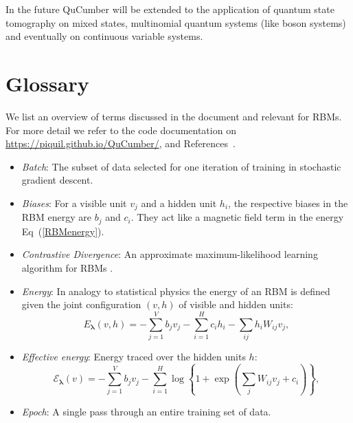 \documentclass[submission, Phys]{SciPost}
\begin{document}
In the future QuCumber will be extended to the application of quantum state tomography on mixed states, multinomial quantum systems (like boson systems) and eventually on continuous variable systems.

\section{Glossary}
\label{Glossary}

We list an overview of terms discussed in the document and relevant for RBMs. For more detail we refer to the code documentation on \url{https://piquil.github.io/QuCumber/}, and References~\cite{hinton2002training, hinton2012practical}.

\begin{itemize}

	\item {\it Batch}: The subset of data selected for one iteration of training in stochastic gradient descent.

	\item {\it Biases}: For a visible unit $v_j$ and a hidden unit $h_i$, the respective biases in the RBM energy are $b_j$ and $c_i$. They act like a magnetic field term in the energy Eq~(\ref{RBMenergy}).

	\item {\it Contrastive Divergence}: An approximate maximum-likelihood learning algorithm for RBMs \cite{hinton2002training}.

	\item {\it Energy}: In analogy to statistical physics the energy of an RBM is defined given the joint configuration $(v,h)$ of visible and hidden units:
	      \begin{equation}
		      E_{\bm{\lambda}}(v,h) = - \sum\limits_{j=1}^V b_j v_j - \sum\limits_{i=1}^H c_i h_i - \sum\limits_{ij} h_i W_{ij} v_j, \label{RBMenergy}
	      \end{equation}

	\item {\it Effective energy}: Energy traced over the hidden units $h$:
	      \begin{equation}
		      \mathcal{E}_{\bm{\lambda}}(v) = - \sum\limits_{j=1}^V b_j v_j - \sum\limits_{i=1}^H \log \left\{ 1 + \exp \left( \sum\limits_{j} W_{ij}v_j +c_i\right) \right\}, \label{RBMeffectiveenergy}
	      \end{equation}

	\item {\it Epoch}: A single pass through an entire training set of data.


\end{itemize}
\end{document}
